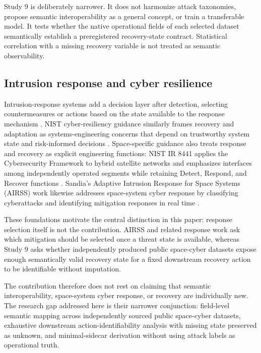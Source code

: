 \documentclass[preprint,12pt]{elsarticle}
\begin{document}
Study 9 is deliberately narrower. It does not harmonize attack taxonomies, propose semantic interoperability as a general concept, or train a transferable model. It tests whether the native operational fields of each selected dataset semantically establish a preregistered recovery-state contract. Statistical correlation with a missing recovery variable is not treated as semantic observability.

\subsection{Intrusion response and cyber resilience}

Intrusion-response systems add a decision layer after detection, selecting countermeasures or actions based on the state available to the response mechanism \cite{bashendy2023irs}. NIST cyber-resiliency guidance similarly frames recovery and adaptation as systems-engineering concerns that depend on trustworthy system state and risk-informed decisions \cite{ross2021cyberresilient}. Space-specific guidance also treats response and recovery as explicit engineering functions: NIST IR 8441 applies the Cybersecurity Framework to hybrid satellite networks and emphasizes interfaces among independently operated segments while retaining Detect, Respond, and Recover functions \cite{mccarthy2023hsn}. Sandia's Adaptive Intrusion Response for Space Systems (AIRSS) work likewise addresses space-system cyber response by classifying cyberattacks and identifying mitigation responses in real time \cite{sahakian2021airss}.

These foundations motivate the central distinction in this paper: response selection itself is not the contribution. AIRSS and related response work ask which mitigation should be selected once a threat state is available, whereas Study 9 asks whether independently produced public space-cyber datasets expose enough semantically valid recovery state for a fixed downstream recovery action to be identifiable without imputation.

The contribution therefore does not rest on claiming that semantic interoperability, space-system cyber response, or recovery are individually new. The research gap addressed here is their narrower conjunction: field-level semantic mapping across independently sourced public space-cyber datasets, exhaustive downstream action-identifiability analysis with missing state preserved as unknown, and minimal-sidecar derivation without using attack labels as operational truth.
\end{document}
